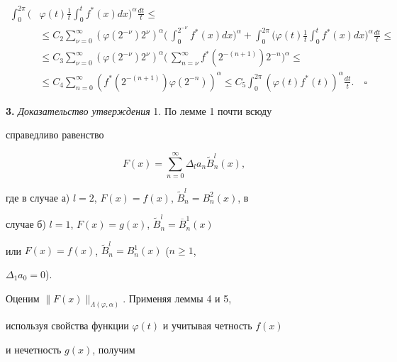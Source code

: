 \begin{align*}


\int^{2\pi}_0\biggl(&\varphi(t)\frac{1}{t}\int^t_0 f^*(x)dx


\biggr)^\alpha\frac{dt}{t}\le \\


&\le C_2\sum^\infty_{\nu=0}(\varphi(2^{-\nu})2^\nu)^\alpha


\biggl(\,\int^{2^{-\nu}}_0 f^*(x)dx\biggr)^\alpha+


\int^{2\pi}_0\biggl(\varphi(t)\frac{1}{t}\int^t_0


f^*(x)dx\biggr)^\alpha\frac{dt}{t}\le \\


&\le C_3\sum^\infty_{\nu=0}(\varphi(2^{-\nu})2^\nu)^\alpha


\biggl(\,\sum^\infty_{n=\nu}f^*(2^{-(n+1)})2^{-n}\biggr)^\alpha\le \\


&\le C_4\sum^\infty_{n=0}(f^*(2^{-(n+1)})\varphi(2^{-n}))^\alpha\le


C_5\int^{2\pi}_0(\varphi(t)f^*(t))^\alpha\frac{dt}{t}.


\quad\square


\end{align*}





{\bf 3.} {\it Доказательство утверждения} 1. По лемме 1 почти всюду


справедливо равенство


$$


F(x)=\sum^\infty_{n=0}\Delta_l a_n\widetilde B^l_n(x),


$$


где в случае а) $l=2$, $F(x)=f(x)$, $\widetilde B^l_n=B^2_n(x)$, в


случае б) $l=1$, $F(x)=g(x)$, $\widetilde B^l_n=\overline B^1_n(x)$


или $F(x)=f(x)$, $\widetilde B^l_n=B^1_n(x)$ ($n\ge 1$,


$\Delta_1a_0=0$).





Оценим $\|F(x)\|_{\Lambda(\varphi,\alpha)}$. Применяя леммы 4 и 5,


используя свойства функции $\varphi(t)$ и учитывая четность $f(x)$


и нечетность $g(x)$, получим


